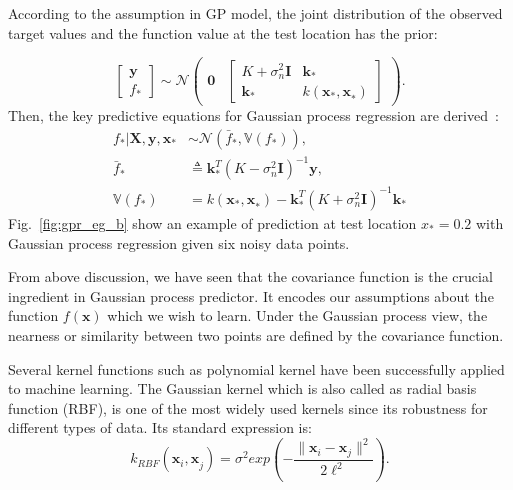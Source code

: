 According to the assumption in GP model, the joint distribution of the observed target values and the function value at the test location has the prior:

\begin{equation}
	\begin{bmatrix}
		\mathbf{y}\\
		f_*
	\end{bmatrix}
	\sim \mathcal{N} \begin{pmatrix}
		\mathbf{0} & \begin{bmatrix}
			K + \sigma_n^2 \mathbf{I} & \mathbf{k}_*\\
			\mathbf{k}_*              & k(\mathbf{x}_*\mathbf{,x}_*)
		\end{bmatrix}
	\end{pmatrix}.
	\label{eq:joint_dist_prior}
\end{equation}
Then, the key predictive equations for Gaussian process regression are derived~\cite{williams1996gaussian}:
\begin{align}
	f_*|\mathbf{X},\mathbf{y},\mathbf{x}_* &\sim \mathcal{N}(\bar{f}_*,\mathbb{V}(f_*)),\label{eq:gpr_prediction}\\
	\bar{f}_* &\triangleq \mathbf{k}_*^T (K-\sigma_n^2 \mathbf{I})^{-1} \mathbf{y},\\
	\mathbb{V}(f_*) &= k(\mathbf{x}_*\mathbf{,x}_*)-\mathbf{k}_*^T(K+\sigma_n^2 \mathbf{I})^{-1}\mathbf{k}_*
\end{align}
Fig.~\ref{fig:gpr_eg_b} show an example of prediction at test location $x_*=0.2$ with Gaussian process regression given six noisy data points.


From above discussion, we have seen that the covariance function is the crucial ingredient in Gaussian process predictor. It encodes our assumptions about the function $f(\mathbf{x})$ which we wish to learn. Under the Gaussian process view, the nearness or similarity between two points are defined by the covariance function.

Several kernel functions such as polynomial kernel have been successfully applied to machine learning. The Gaussian kernel which is also called as radial basis function (RBF), is one of the most widely used kernels since its robustness for different types of data. Its standard expression is:
\begin{equation}
	k_{RBF}(\mathbf{x}_i\mathbf{,x}_j) = \sigma^2 exp(-\frac{\left.\|\mathbf{x}_i - \mathbf{x}_j\right.\| ^2}{2\ell^2}).
	\label{eq:rbf}
\end{equation}

